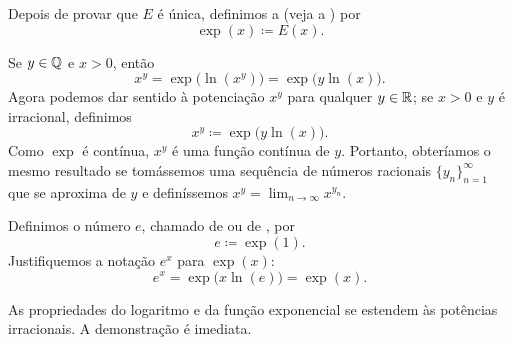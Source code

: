 Depois de provar que $E$ é única, definimos a
\emph{} (veja a ) por
\begin{equation*}
\exp(x) \coloneqq E(x) .
\end{equation*}
\begin{myfigureht}
\caption{Gráfico de $e^x$ junto com um campo de direções que indica a
inclinação $y$ em cada ponto $(x,y)$. A equação
$\frac{d}{dx} e^x = e^x$ significa que $y=e^x$ segue essas inclinações.\label{fig:exp}}
\end{myfigureht}

Se $y \in {\mathbb{Q}}$ e $x > 0$, então
\begin{equation*}
x^y = \exp\bigl(\ln(x^y)\bigr) = \exp\bigl(y\ln(x)\bigr) .
\end{equation*}
Agora podemos dar sentido à potenciação $x^y$ para qualquer $y \in {\mathbb{R}}$;
se $x > 0$ e $y$ é irracional, definimos
\begin{equation*}
x^y \coloneqq \exp\bigl(y\ln(x)\bigr) .
\end{equation*}
Como $\exp$ é contínua, $x^y$ é uma função contínua de $y$.
Portanto, obteríamos o mesmo resultado se tomássemos uma sequência de números
racionais $\{ y_n \}_{n=1}^\infty$ que se aproxima de $y$ e definíssemos
$x^y = \lim_{n\to\infty} x^{y_n}$.

Definimos o número $e$,
chamado de \emph{} ou
de \emph{}, por
\begin{equation*}
e \coloneqq \exp(1) .
\end{equation*}
Justifiquemos a notação $e^x$ para $\exp(x)$:
\begin{equation*}
e^x = \exp\bigl(x \ln(e) \bigr) = \exp(x) .
\end{equation*}

As propriedades do logaritmo e da função exponencial se estendem às
potências irracionais. A demonstração é imediata.

